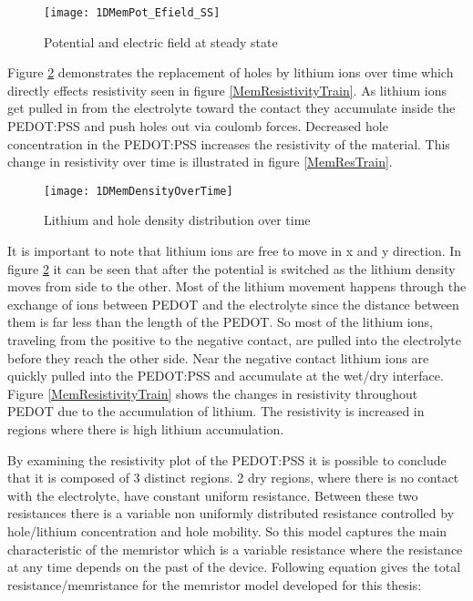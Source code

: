 \begin{doublespace}
\begin{figure}[!htp]
\centering
\texttt{[image: 1DMemPot\_Efield\_SS]}
\caption{Potential and electric field at steady state} 
\label{MemEss}
\end{figure}

Figure \ref{MempLi} demonstrates the replacement of holes by lithium ions over time which directly effects resistivity seen in figure \ref{MemResistivityTrain}.  As lithium ions get pulled in from the electrolyte toward the contact they accumulate inside the PEDOT:PSS and push holes out via coulomb forces. Decreased hole concentration in the PEDOT:PSS increases the resistivity of the material. This change in resistivity over time is illustrated in figure \ref{MemResTrain}.

\begin{figure}[!htp]
\centering
\texttt{[image: 1DMemDensityOverTime]}
\caption{Lithium and hole density distribution over time} 
\label{MempLi}
\end{figure}

It is important to note that lithium ions are free to move in x and y direction. In figure \ref{MempLi} it can be seen that after the potential is switched as the lithium density moves from  side to the other. Most of the lithium movement happens through the exchange of ions between PEDOT and the electrolyte since the distance between them is far less than the length of the PEDOT. So most of the lithium ions, traveling from the positive to the negative contact, are pulled into the electrolyte before they reach the other side. Near the negative contact lithium ions are quickly pulled into the PEDOT:PSS and accumulate at the wet/dry interface. Figure \ref{MemResistivityTrain} shows the changes in resistivity throughout PEDOT due to the accumulation of lithium. The resistivity is increased in regions where there is high lithium accumulation. 

By examining the resistivity plot of the PEDOT:PSS it is possible to conclude that it is composed of 3 distinct regions. 2 dry regions, where there is no contact with the electrolyte, have constant uniform resistance. Between these two resistances there is a variable non uniformly distributed resistance controlled by hole/lithium concentration and hole mobility. So this model captures the main characteristic of the memristor which is a variable resistance where the resistance at any time depends on the past of the device. Following equation gives the total resistance/memristance for the memristor model developed for this thesis:


\end{doublespace}
